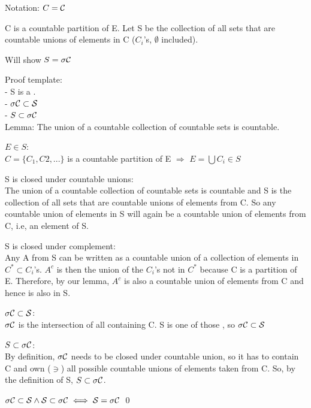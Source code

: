 Notation: $ C = \cal{C} $

C is a countable partition of E. Let S be the collection of all sets that are countable unions of elements in C ($C_i$'s, $\emptyset$ included).

Will show $ S = \sigma \cal{C} $

Proof template:\\
- S is a \sa.\\
- $ \sigma \cal{C} \subset S $\\
- $ S \subset \sigma \cal{C} $\\

Lemma: The union of a countable collection of countable sets is countable.

$E \in S$: \\
$C = \{C_1, C2, ... \}$ is a countable partition of E 
$\Rightarrow$
$E = \bigcup C_i \in S $

S is closed under countable unions: \\
The union of a countable collection of countable sets is countable and S is the collection of all sets that are countable unions of elements from C. So any countable union of elements in S will again be a countable union of elements from C, i.e, an element of S.

S is closed under complement: \\
Any A from S can be written as a countable union of a collection of elements in $C^* \subset C_i$'s. $A^c$ is then the union of the $ C_i $'s not in $C^*$ because C is a partition of E. Therefore, by our lemma, $A^c$ is also a countable union of elements from C and hence is also in S.

$ \sigma \cal{C} \subset S $:
\\
$\sigma \cal{C}$ is the intersection of all \sa containing C. S is one of those \sa, so $ \sigma \cal{C} \subset S $

$ S \subset \sigma \cal{C} $:
\\
By definition, $\sigma \cal{C}$ needs to be closed under countable union, so it has to contain C and own ($\owns$) all possible countable unions of elements taken from C. So, by the definition of S, $S \subset \sigma \cal{C}$.

$ \sigma \cal{C} \subset S \land S \subset \sigma \cal{C} \;\Longleftrightarrow\;  S = \sigma \cal{C} $ \qed
